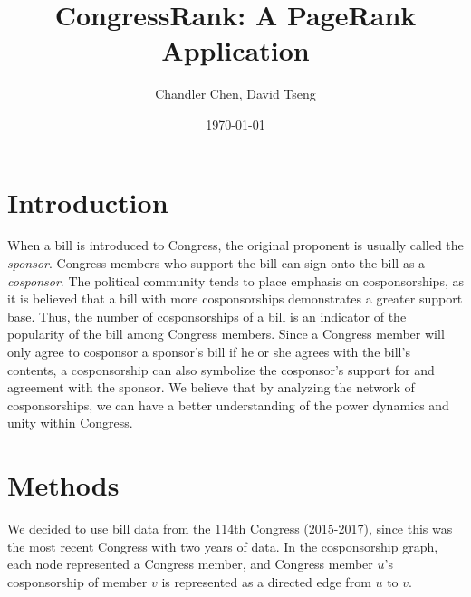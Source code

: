 \documentclass[11pt]{article}
\begin{document}
\title{CongressRank: A PageRank Application}
\author{Chandler Chen, David Tseng}
\date{\today}
\maketitle

\section*{Introduction}
When a bill is introduced to Congress, the original proponent is usually called the \textit{sponsor}. Congress members who support the bill can sign onto the bill as a \textit{cosponsor}. The political community tends to place emphasis on cosponsorships, as it is believed that a bill with more cosponsorships demonstrates a greater support base. Thus, the number of cosponsorships of a bill is an indicator of the popularity of the bill among Congress members. Since a Congress member will only agree to cosponsor a sponsor's bill if he or she agrees with the bill's contents, a cosponsorship can also symbolize the cosponsor's support for and agreement with the sponsor. We believe that by analyzing the network of cosponsorships, we can have a better understanding of the power dynamics and unity within Congress. 




\section*{Methods}
We decided to use bill data from the 114th Congress (2015-2017), since this was the most recent Congress with two years of data. In the cosponsorship graph, each node represented a Congress member, and Congress member $u$'s cosponsorship of member $v$ is represented as a directed edge from $u$ to $v$. 






\end{document}

